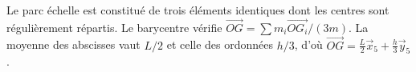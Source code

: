 \begin{corrigebox}
Le parc échelle est constitué de trois éléments identiques dont
            les centres sont régulièrement répartis. Le barycentre vérifie
            $\overrightarrow{OG}=\sum m_i\overrightarrow{OG_i}/(3m)$. La moyenne des
            abscisses vaut $L/2$ et celle des ordonnées $h/3$, d'où
            $\boxed{\overrightarrow{OG}=\frac L2\vec x_5+\frac h3\vec y_5}$.
\end{corrigebox}
